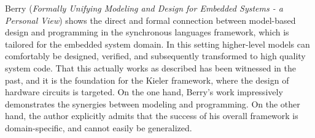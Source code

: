 


Berry
\cite{isola-2016-berry}
({\em Formally Unifying Modeling and Design for
Embedded Systems - a Personal View})
shows the direct and formal connection between model-based design and programming in the synchronous languages framework, which is tailored for the embedded system domain. In this setting higher-level models can comfortably be designed, verified, and subsequently transformed to high quality system code. That this actually works as described has been witnessed in the past, and it is the foundation for the Kieler framework, where the design of hardware circuits is targeted. On the one hand, Berry's work impressively demonstrates the synergies between modeling and programming. On the other hand, the author explicitly admits that the success of his overall framework is domain-specific, and cannot easily be generalized.

